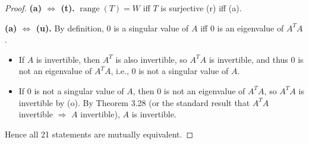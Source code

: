 \documentclass[11pt]{article}
\theoremstyle{definition}
\begin{document}
\begin{proof}
\medskip
\noindent\textbf{(a) $\Leftrightarrow$ (t).}
$\operatorname{range}(T) = W$ iff $T$ is surjective (r) iff (a).

\medskip
\noindent\textbf{(a) $\Leftrightarrow$ (u).}
By definition, $0$ is a singular value of $A$ iff $0$ is an eigenvalue of $A^T A$.
\begin{itemize}
    \item[(a)$\Rightarrow$(u):] If $A$ is invertible, then $A^T$ is also invertible, so $A^T A$ is invertible, and thus $0$ is not an eigenvalue of $A^T A$, i.e., $0$ is not a singular value of $A$.
    \item[(u)$\Rightarrow$(a):] If $0$ is not a singular value of $A$, then $0$ is not an eigenvalue of $A^T A$, so $A^T A$ is invertible by (o). By Theorem 3.28 (or the standard result that $A^T A$ invertible $\Rightarrow$ $A$ invertible), $A$ is invertible.
\end{itemize}
Hence all 21 statements are mutually equivalent.
\end{proof}
\end{document}
